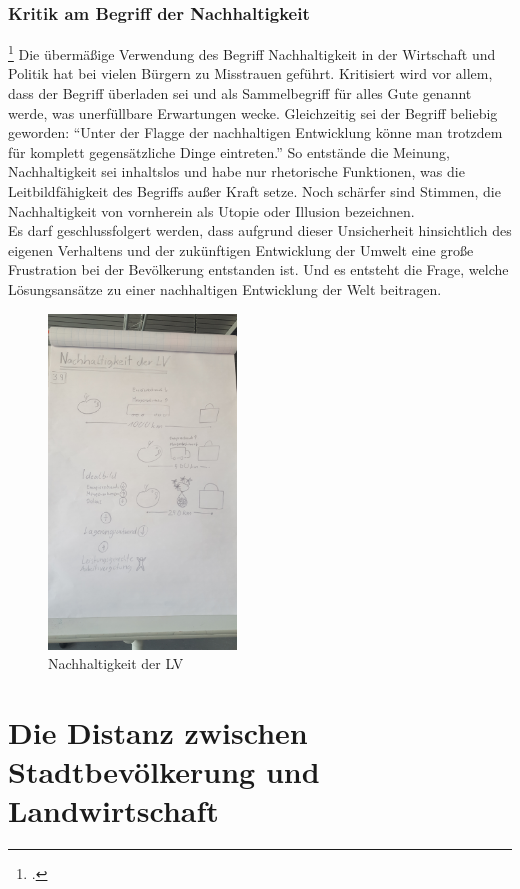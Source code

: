 \documentclass{scrartcl}
\begin{document}
\subsubsection{Kritik am Begriff der Nachhaltigkeit}\footcite{NachhaltigeBrockhaus.de}
Die übermäßige Verwendung des Begriff Nachhaltigkeit in der Wirtschaft und Politik hat bei vielen Bürgern zu Misstrauen geführt. Kritisiert wird vor allem, dass der Begriff überladen sei und als Sammelbegriff für alles Gute genannt werde, was unerfüllbare Erwartungen wecke. Gleichzeitig sei der Begriff beliebig geworden: “Unter der Flagge der nachhaltigen Entwicklung könne man trotzdem für komplett gegensätzliche Dinge eintreten.” So entstände die Meinung, Nachhaltigkeit sei inhaltslos und habe nur rhetorische Funktionen, was die Leitbildfähigkeit des Begriffs außer Kraft setze. Noch schärfer sind Stimmen, die Nachhaltigkeit von vornherein als Utopie oder Illusion bezeichnen.
\\
Es darf geschlussfolgert werden, dass aufgrund dieser Unsicherheit hinsichtlich des eigenen Verhaltens und der zukünftigen Entwicklung der Umwelt eine große Frustration bei der Bevölkerung entstanden ist. Und es entsteht die Frage, welche Lösungsansätze zu einer nachhaltigen Entwicklung der Welt beitragen. 

\begin{figure}[h]
\centering
\includegraphics[width=5cm]{image_folder/skizze1.jpg}
\caption{Nachhaltigkeit der LV}
\label{fig:Skizze_Nachhaltigkeit}
\end{figure}

\FloatBarrier

\section{Die Distanz zwischen Stadtbevölkerung und Landwirtschaft}
\end{document}
